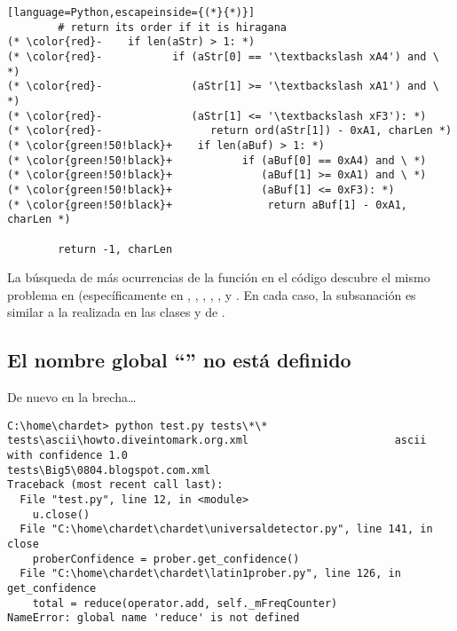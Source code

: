 \begin{lstlisting}[language=Python,escapeinside={(*}{*)}]
        # return its order if it is hiragana
(* \color{red}-    if len(aStr) > 1: *)
(* \color{red}-           if (aStr[0] == '\textbackslash xA4') and \ *)
(* \color{red}-              (aStr[1] >= '\textbackslash xA1') and \ *)
(* \color{red}-              (aStr[1] <= '\textbackslash xF3'): *)
(* \color{red}-                 return ord(aStr[1]) - 0xA1, charLen *)
(* \color{green!50!black}+    if len(aBuf) > 1: *)
(* \color{green!50!black}+           if (aBuf[0] == 0xA4) and \ *)
(* \color{green!50!black}+              (aBuf[1] >= 0xA1) and \ *)
(* \color{green!50!black}+              (aBuf[1] <= 0xF3): *)
(* \color{green!50!black}+               return aBuf[1] - 0xA1, charLen *)

        return -1, charLen
\end{lstlisting}

La búsqueda de más ocurrencias de la función  en el código descubre el mismo problema en  (específicamente en , , , , , y . En cada caso, la subsanación es similar a la realizada en las clases  y  de .

\subsection{El nombre global ``'' no está definido}

De nuevo en la brecha\ldots


\noindent\begin{minipage}{\textwidth}
\begin{lstlisting}[breaklines=true]
C:\home\chardet> python test.py tests\*\*
tests\ascii\howto.diveintomark.org.xml                       ascii with confidence 1.0
tests\Big5\0804.blogspot.com.xml
Traceback (most recent call last):
  File "test.py", line 12, in <module>
    u.close()
  File "C:\home\chardet\chardet\universaldetector.py", line 141, in close
    proberConfidence = prober.get_confidence()
  File "C:\home\chardet\chardet\latin1prober.py", line 126, in get_confidence
    total = reduce(operator.add, self._mFreqCounter)
NameError: global name 'reduce' is not defined
\end{lstlisting}
\end{minipage}

